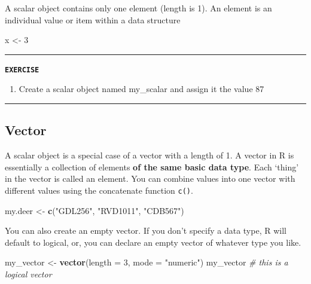 \documentclass[
]{book}
\newenvironment{Shaded}{\begin{snugshade}}{\end{snugshade}}
\newcommand{\AttributeTok}[1]{\textcolor[rgb]{0.13,0.29,0.53}{#1}}
\newcommand{\CommentTok}[1]{\textcolor[rgb]{0.56,0.35,0.01}{\textit{#1}}}
\newcommand{\DecValTok}[1]{\textcolor[rgb]{0.00,0.00,0.81}{#1}}
\newcommand{\FunctionTok}[1]{\textcolor[rgb]{0.13,0.29,0.53}{\textbf{#1}}}
\newcommand{\NormalTok}[1]{#1}
\newcommand{\OtherTok}[1]{\textcolor[rgb]{0.56,0.35,0.01}{#1}}
\newcommand{\StringTok}[1]{\textcolor[rgb]{0.31,0.60,0.02}{#1}}
\providecommand{\tightlist}{%
  \setlength{\itemsep}{0pt}\setlength{\parskip}{0pt}}
\begin{document}
A scalar object contains only one element (length is 1). An element is an individual value or item within a data structure

\begin{Shaded}
\begin{Highlighting}[]
\NormalTok{x }\OtherTok{\textless{}{-}} \DecValTok{3}
\end{Highlighting}
\end{Shaded}

\begin{center}\rule{0.5\linewidth}{0.5pt}\end{center}

\textbf{\texttt{EXERCISE}}

\begin{enumerate}
\def\labelenumi{\arabic{enumi}.}
\tightlist
\item
  Create a scalar object named my\_scalar and assign it the value 87
\end{enumerate}

\begin{center}\rule{0.5\linewidth}{0.5pt}\end{center}

\subsection{Vector}\label{vector}

A scalar object is a special case of a vector with a length of 1. A vector in R is essentially a collection of elements \textbf{of the same basic data type}. Each `thing' in the vector is called an element. You can combine values into one vector with different values using the concatenate function \texttt{c()}.

\begin{Shaded}
\begin{Highlighting}[]
\NormalTok{my.deer }\OtherTok{\textless{}{-}} \FunctionTok{c}\NormalTok{(}\StringTok{"GDL256"}\NormalTok{, }\StringTok{"RVD1011"}\NormalTok{, }\StringTok{"CDB567"}\NormalTok{)}
\end{Highlighting}
\end{Shaded}

You can also create an empty vector. If you don't specify a data type, R will default to logical, or, you can declare an empty vector of whatever type you like.

\begin{Shaded}
\begin{Highlighting}[]
\NormalTok{my\_vector }\OtherTok{\textless{}{-}} \FunctionTok{vector}\NormalTok{(}\AttributeTok{length =} \DecValTok{3}\NormalTok{, }\AttributeTok{mode =} \StringTok{"numeric"}\NormalTok{)}
\NormalTok{my\_vector  }\CommentTok{\# this is a logical vector}
\end{Highlighting}
\end{Shaded}
\end{document}
